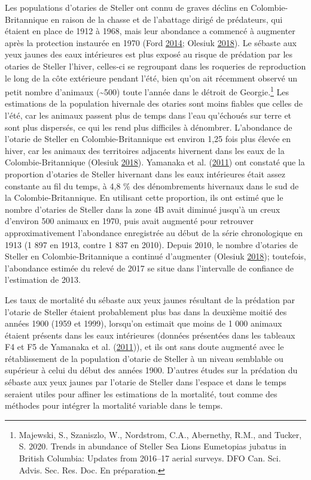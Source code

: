 \documentclass[french,11pt]{book}
\begin{document}
Les populations d'otaries de Steller ont connu de graves déclins en Colombie-Britannique en raison de la chasse et de l'abattage dirigé de prédateurs, qui étaient en place de 1912 à 1968, mais leur abondance a commencé à augmenter après la protection instaurée en 1970 (Ford \protect\hyperlink{ref-ford2014}{2014}; Olesiuk \protect\hyperlink{ref-olesiuk2018}{2018}). Le sébaste aux yeux jaunes des eaux intérieures est plus exposé au risque de prédation par les otaries de Steller l'hiver, celles-ci se regroupant dans les roqueries de reproduction le long de la côte extérieure pendant l'été, bien qu'on ait récemment observé un petit nombre d'animaux (\textasciitilde500) toute l'année dans le détroit de Georgie.\footnote{Majewski, S., Szaniszlo, W., Nordstrom, C.A., Abernethy, R.M., and Tucker, S. 2020. Trends in abundance of Steller Sea Lions Eumetopias jubatus in British Columbia: Updates from 2016--17 aerial surveys. DFO Can. Sci. Advis. Sec. Res. Doc. En préparation.} Les estimations de la population hivernale des otaries sont moins fiables que celles de l'été, car les animaux passent plus de temps dans l'eau qu'échoués sur terre et sont plus dispersés, ce qui les rend plus difficiles à dénombrer. L'abondance de l'otarie de Steller en Colombie-Britannique est environ 1,25 fois plus élevée en hiver, car les animaux des territoires adjacents hivernent dans les eaux de la Colombie-Britannique (Olesiuk \protect\hyperlink{ref-olesiuk2018}{2018}). Yamanaka et al. (\protect\hyperlink{ref-yamanaka2011}{2011}) ont constaté que la proportion d'otaries de Steller hivernant dans les eaux intérieures était assez constante au fil du temps, à 4,8 \% des dénombrements hivernaux dans le sud de la Colombie-Britannique. En utilisant cette proportion, ils ont estimé que le nombre d'otaries de Steller dans la zone 4B avait diminué jusqu'à un creux d'environ 500 animaux en 1970, puis avait augmenté pour retrouver approximativement l'abondance enregistrée au début de la série chronologique en 1913 (1 897 en 1913, contre 1 837 en 2010). Depuis 2010, le nombre d'otaries de Steller en Colombie-Britannique a continué d'augmenter (Olesiuk \protect\hyperlink{ref-olesiuk2018}{2018}); toutefois, l'abondance estimée du relevé de 2017 se situe dans l'intervalle de confiance de l'estimation de 2013.

Les taux de mortalité du sébaste aux yeux jaunes résultant de la prédation par l'otarie de Steller étaient probablement plus bas dans la deuxième moitié des années 1900 (1959 et 1999), lorsqu'on estimait que moins de 1 000 animaux étaient présents dans les eaux intérieures (données présentées dans les tableaux F4 et F5 de Yamanaka et al. (\protect\hyperlink{ref-yamanaka2011}{2011})), et ils ont sans doute augmenté avec le rétablissement de la population d'otarie de Steller à un niveau semblable ou supérieur à celui du début des années 1900. D'autres études sur la prédation du sébaste aux yeux jaunes par l'otarie de Steller dans l'espace et dans le temps seraient utiles pour affiner les estimations de la mortalité, tout comme des méthodes pour intégrer la mortalité variable dans le temps.
\end{document}
